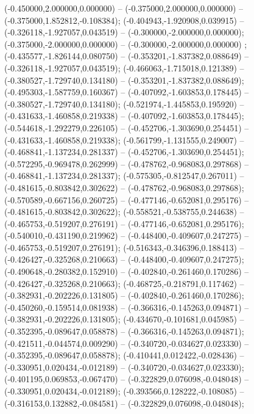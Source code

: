  (-0.450000,2.000000,0.000000) -- (-0.375000,2.000000,0.000000) -- (-0.375000,1.852812,-0.108384);
 (-0.404943,-1.920908,0.039915) -- (-0.326118,-1.927057,0.043519) -- (-0.300000,-2.000000,0.000000);
 (-0.375000,-2.000000,0.000000) -- (-0.300000,-2.000000,0.000000) ;
 (-0.435577,-1.826144,0.080750) -- (-0.353201,-1.837382,0.088649) -- (-0.326118,-1.927057,0.043519);
 (-0.466063,-1.715018,0.121389) -- (-0.380527,-1.729740,0.134180) -- (-0.353201,-1.837382,0.088649);
 (-0.495303,-1.587759,0.160367) -- (-0.407092,-1.603853,0.178445) -- (-0.380527,-1.729740,0.134180);
 (-0.521974,-1.445853,0.195920) -- (-0.431633,-1.460858,0.219338) -- (-0.407092,-1.603853,0.178445);
 (-0.544618,-1.292279,0.226105) -- (-0.452706,-1.303690,0.254451) -- (-0.431633,-1.460858,0.219338);
 (-0.561799,-1.131555,0.249007) -- (-0.468841,-1.137234,0.281337) -- (-0.452706,-1.303690,0.254451);
 (-0.572295,-0.969478,0.262999) -- (-0.478762,-0.968083,0.297868) -- (-0.468841,-1.137234,0.281337);
 (-0.575305,-0.812547,0.267011) -- (-0.481615,-0.803842,0.302622) -- (-0.478762,-0.968083,0.297868);
 (-0.570589,-0.667156,0.260725) -- (-0.477146,-0.652081,0.295176) -- (-0.481615,-0.803842,0.302622);
 (-0.558521,-0.538755,0.244638) -- (-0.465753,-0.519207,0.276191) -- (-0.477146,-0.652081,0.295176);
 (-0.540010,-0.431190,0.219962) -- (-0.448400,-0.409607,0.247275) -- (-0.465753,-0.519207,0.276191);
 (-0.516343,-0.346396,0.188413) -- (-0.426427,-0.325268,0.210663) -- (-0.448400,-0.409607,0.247275);
 (-0.490648,-0.280382,0.152910) -- (-0.402840,-0.261460,0.170286) -- (-0.426427,-0.325268,0.210663);
 (-0.468725,-0.218791,0.117462) -- (-0.382931,-0.202226,0.131805) -- (-0.402840,-0.261460,0.170286);
 (-0.450260,-0.159514,0.081938) -- (-0.366316,-0.145263,0.094871) -- (-0.382931,-0.202226,0.131805);
 (-0.434670,-0.101681,0.045985) -- (-0.352395,-0.089647,0.058878) -- (-0.366316,-0.145263,0.094871);
 (-0.421511,-0.044574,0.009290) -- (-0.340720,-0.034627,0.023330) -- (-0.352395,-0.089647,0.058878);
 (-0.410441,0.012422,-0.028436) -- (-0.330951,0.020434,-0.012189) -- (-0.340720,-0.034627,0.023330);
 (-0.401195,0.069853,-0.067470) -- (-0.322829,0.076098,-0.048048) -- (-0.330951,0.020434,-0.012189);
 (-0.393566,0.128222,-0.108085) -- (-0.316153,0.132882,-0.084581) -- (-0.322829,0.076098,-0.048048);
